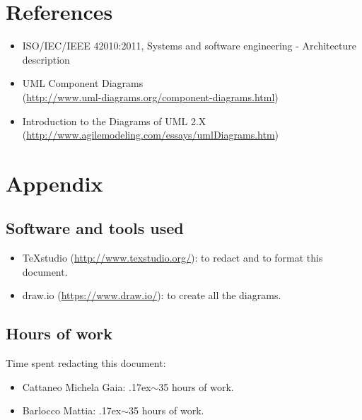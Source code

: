 \documentclass[18pt,oneside,a4paper, titlepage]{article}
\begin{document}
	\section{References}
		\begin{itemize}
			\item  ISO/IEC/IEEE 42010:2011, Systems and software engineering - Architecture description
			\item UML Component Diagrams\\ (\url{http://www.uml-diagrams.org/component-diagrams.html})
			\item Introduction to the Diagrams of UML 2.X \\(\url{http://www.agilemodeling.com/essays/umlDiagrams.htm})
		\end{itemize}
\newpage
	\section{Appendix}
		\subsection{Software and tools used}
				\begin{itemize}
					\item TeXstudio (\url{http://www.texstudio.org/}): to redact and to format this document.
					\item draw.io (\url{https://www.draw.io/}): to create all the diagrams.
				\end{itemize}
		\subsection{Hours of work}
			Time spent redacting this document:
			\begin{itemize}
				\item Cattaneo Michela Gaia: {\raise.17ex\hbox{$\scriptstyle\sim$}}35 hours of work.
				\item Barlocco Mattia: {\raise.17ex\hbox{$\scriptstyle\sim$}}35 hours of work.
			\end{itemize}
		
		
		
\end{document}
